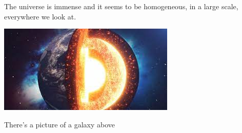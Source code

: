 \documentclass{article}
\begin{document}
The universe is immense and it seems to be homogeneous, 
in a large scale, everywhere we look at.

\includegraphics{download.jpg}

There's a picture of a galaxy above
\end{document}
